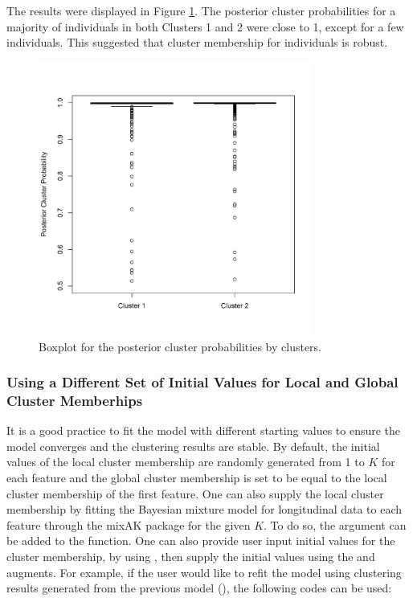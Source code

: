 The results were displayed in Figure \ref{fig:posterior_prob}. The posterior cluster probabilities for a majority of individuals in both Clusters 1 and 2 were close to 1, except for a few individuals. This suggested that cluster membership for individuals is robust. 

\begin{figure}[t!]
\centering
\includegraphics[width=9cm,height=9cm]{./Figures/posterior_prob.JPEG}
\caption{\label{fig:posterior_prob}  Boxplot for the posterior cluster probabilities by clusters.}
\end{figure}

\subsubsection{Using a Different Set of Initial Values for Local and Global Cluster Memberhips}
It is a good practice to fit the model with different starting values to ensure the model converges and the clustering results are stable. By default, the initial values of the local cluster membership are randomly generated from 1 to $K$ for each feature and the global cluster membership is set to be equal to the local cluster membership of the first feature. One can also supply the local cluster membership by fitting the Bayesian mixture model for longitudinal data to each feature through the mixAK package for the given $K$. To do so, the argument  can be added to the  function. One can also provide user input initial values for the cluster membership, by using , then supply the initial values using the  and  augments. For example, if the user would like to refit the model using clustering results generated from the previous model  (), the following codes can be used:  

